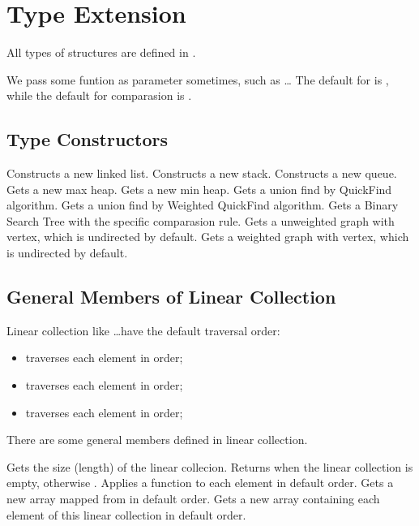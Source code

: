 \section{Type Extension}
All types of structures are defined in .

We pass some funtion as parameter sometimes, such as  \ldots 
The default  for  is , while the default for comparasion is .

\subsection{Type Constructors}
Constructs a new linked list.
Constructs a new stack.
Constructs a new queue.
Gets a new max heap.
Gets a new min heap.
Gets a union find by QuickFind algorithm.
Gets a union find by Weighted QuickFind algorithm.
Gets a Binary Search Tree with the specific comparasion rule.
Gets a unweighted graph with  vertex, which is undirected by default.
Gets a weighted graph with  vertex, which is undirected by default.

\subsection{General Members of Linear Collection}
Linear collection like  \ldots have the default traversal order:

\begin{itemize}
  \item {} traverses each element in  order;
  \item {} traverses each element in  order;
  \item {} traverses each element in  order;
\end{itemize}

There are some general members defined in linear collection. 

Gets the size (length) of the linear collecion.
Returns  when the linear collection is empty, otherwise .
Applies a function to each element in default order.
Gets a new array mapped from  in default order.
Gets a new array containing each element of this linear collection in default order.

